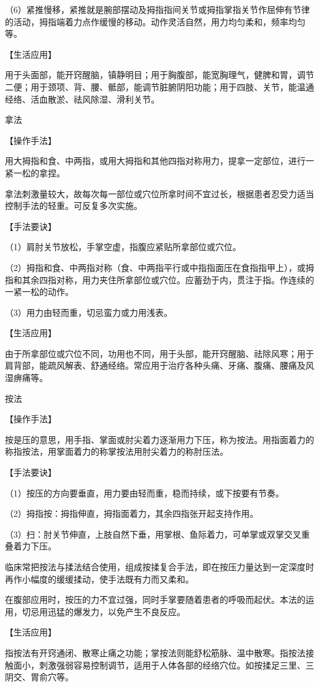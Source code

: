 \documentclass[12pt,UTF8,openany]{ctexbook}
\begin{document}
（6）紧推慢移，紧推就是腕部摆动及拇指指间关节或拇指掌指关节作屈伸有节律的活动，拇指端着力点作缓慢的移动。动作灵活自然，用力均匀柔和，频率均匀等。

【生活应用】

用于头面部，能开窍醒脑，镇静明目；用于胸腹部，能宽胸理气，健脾和胃，调节二便；用于颈项、背、腰、骶部，能调节脏腑阴阳功能；用于四肢、关节，能温通经络、活血散淤、祛风除湿、滑利关节。

拿法

【操作手法】

用大拇指和食、中两指，或用大拇指和其他四指对称用力，提拿一定部位，进行一紧一松的拿捏。

拿法刺激量较大，故每次每一部位或穴位所拿时间不宜过长，根据患者忍受力适当控制手法的轻重。可反复多次实施。

【手法要诀】

（1）肩肘关节放松，手掌空虚，指腹应紧贴所拿部位或穴位。

（2）拇指和食、中两指对称（食、中两指平行或中指指面压在食指指甲上），或拇指和其余四指对称，用力夹住所拿部位或穴位。应蓄劲于内，贯注于指。作连续的一紧一松的动作。

（3）用力由轻而重，切忌蛮力或力用浅表。

【生活应用】

由于所拿部位或穴位不同，功用也不同，用于头部，能开窍醒脑、祛除风寒；用于肩背部，能疏风解表、舒通经络。常应用于治疗各种头痛、牙痛、腹痛、腰痛及风湿痹痛等。

按法

【操作手法】

按是压的意思，用手指、掌面或肘尖着力逐渐用力下压，称为按法。用指面着力的称指按法，用掌面着力的称掌按法用肘尖着力的称肘压法。

【手法要诀】

（1）按压的方向要垂直，用力要由轻而重，稳而持续，或下按要有节奏。

（2）拇指按：拇指伸直，拇指面着力，其余四指张开起支持作用。

（3）扫：肘关节伸直，上肢自然下垂，用掌根、鱼际着力，可单掌或双掌交叉重叠着力下压。

临床常把按法与揉法结合使用，组成按揉复合手法，即在按压力量达到一定深度时再作小幅度的缓缓揉动，使手法既有力而又柔和。

在腹部应用时，按压的力不宜过强，同时手掌要随着患者的呼吸而起伏。本法的运用，切忌用迅猛的爆发力，以免产生不良反应。

【生活应用】

指按法有开窍通闭、散寒止痛之功能；掌按法则能舒松筋脉、温中散寒。指按法接触面小，刺激强弱容易控制调节，适用于人体各部的经络穴位。如按揉足三里、三阴交、胃俞穴等。
\end{document}
